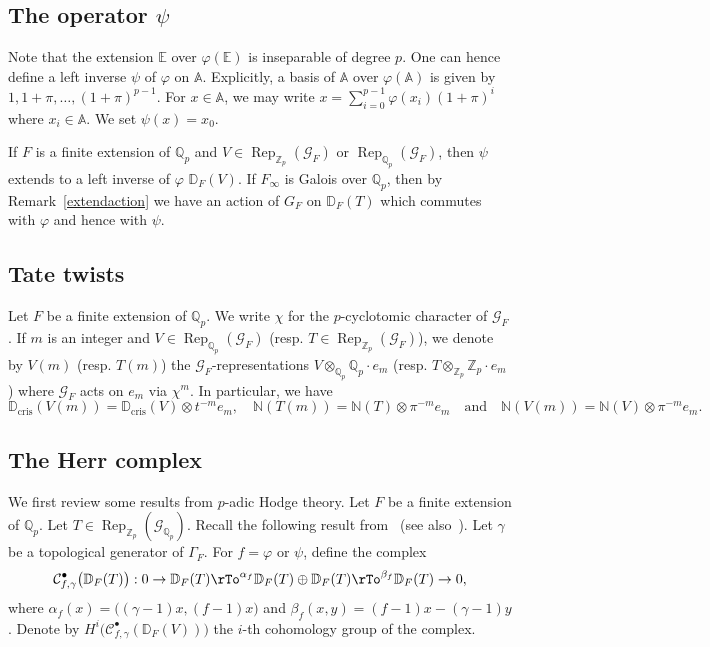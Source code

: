 \documentclass{amsart}
\newcommand{\QQ}{\mathbb Q}
\newcommand{\ZZ}{\mathbb Z}
\newcommand{\EE}{\mathbb E}
\newcommand{\DD}{\mathbb D}
\renewcommand{\AA}{\mathbb A}
\newcommand{\NN}{\mathbb N}
\DeclareMathOperator{\cris}{cris}
\DeclareMathOperator{\Rep}{Rep}
\newcommand{\Qp}{\QQ_p}
\newcommand{\Zp}{\ZZ_p}
\newcommand{\calG}{\mathcal{G}}
\newcommand{\calC}{\mathcal{C}}
\newcommand{\vp}{\varphi}
\begin{document}
  \subsection{The operator $\psi$}

   Note that the extension $\EE$ over $\vp(\EE)$ is inseparable of degree $p$. One can hence define a left inverse $\psi$ of $\vp$ on $\AA$. Explicitly, a basis of $\AA$ over $\vp(\AA)$ is given by $1,1+\pi,\dots,(1+\pi)^{p-1}$. For $x\in\AA$, we may write $x=\sum_{i=0}^{p-1}\vp(x_i)(1+\pi)^i$ where $x_i\in\AA$. We set $\psi(x)=x_0$.
   
   If $F$ is a finite extension of $\QQ_p$ and $V\in\Rep_{\ZZ_p}(\calG_F)$ or $\Rep_{\QQ_p}(\calG_F)$, then $\psi$ extends to a left inverse of $\vp$ $\DD_F(V)$. If $F_\infty$ is Galois over $\QQ_p$, then by Remark~\ref{extendaction} we have an action of $G_F$ on $\DD_F(T)$ which commutes with $\vp$ and hence with $\psi$. 


  \subsection{Tate twists}
   
   Let $F$ be a finite extension of $\Qp$. We write $\chi$ for the $p$-cyclotomic character of $\calG_F$. If $m$ is an integer and $V\in\Rep_{\QQ_p}(\calG_F)$ (resp. $T\in\Rep_{\ZZ_p}(\calG_F)$), we denote by $V(m)$ (resp. $T(m)$) the $\calG_F$-representations  $V\otimes_{\Qp}\Qp\cdot e_m$ (resp. $T\otimes_{\Zp}\Zp\cdot e_m$) where $\calG_F$ acts on $e_m$ via $\chi^m$. In particular, we have
   \[
   \DD_{\cris}(V(m))=\DD_{\cris}(V)\otimes t^{-m}e_m,\quad\NN(T(m))=\NN(T)\otimes\pi^{-m}e_m\quad\text{and}\quad\NN(V(m))=\NN(V)\otimes\pi^{-m}e_m.
   \]

  \subsection{The Herr complex}

   We first review some results from $p$-adic Hodge theory. Let $F$ be a finite extension of $\Qp$. Let $T\in\Rep_{\ZZ_p}(\calG_{\Qp})$. Recall the following result from~\cite{herr98} (see also~\cite[\S 2]{cherbonniercolmez99}). Let $\gamma$ be a topological generator of $\Gamma_F$. For $f=\vp$ or $\psi$, define the complex
   \[ \calC^\bullet_{f,\gamma}\big(\DD_F(T)\big): 0\rightarrow \DD_F(T)\rTo^{\alpha_f}\DD_F(T)\oplus\DD_F(T)\rTo^{\beta_f}\DD_F(T)\rightarrow 0,\]
   where $\alpha_f(x)=\big((\gamma-1)x,(f-1)x\big)$ and $\beta_f(x,y)=(f-1)x-(\gamma-1)y$. Denote by $H^i\big(\calC^\bullet_{f,\gamma}(\DD_F(V))\big)$ the $i$-th cohomology group of the complex. 
   
\end{document}
